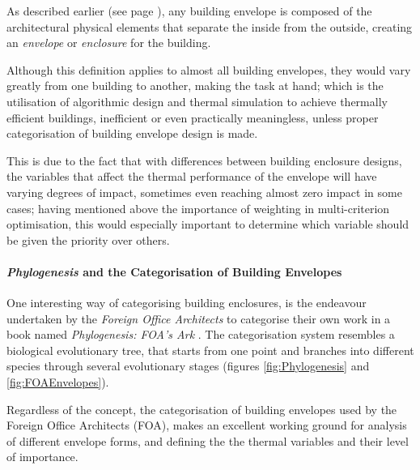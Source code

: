 As described earlier (see page \pageref{BuildEnvDef}), any building envelope is composed of the architectural physical elements that separate the inside from the outside, creating an \emph{envelope} or \emph{enclosure} for the building.

Although this definition applies to almost all building envelopes, they would vary greatly from one building to another, making the task at hand; which is the utilisation of algorithmic design and thermal simulation to achieve thermally efficient buildings, inefficient or even practically meaningless, unless proper categorisation of building envelope design is made.

This is due to the fact that with differences between building enclosure designs, the variables that affect the thermal performance of the envelope will have varying degrees of impact, sometimes even reaching almost zero impact in some cases; having mentioned above the importance of weighting in multi-criterion optimisation, this would especially important to determine which variable should be given the priority over others.

\paragraph{\emph{Phylogenesis} and the Categorisation of Building Envelopes}\mbox{}

One interesting way of categorising building enclosures, is the endeavour undertaken by the \emph{Foreign Office Architects} to categorise their own work in a book named \emph{Phylogenesis: FOA's Ark} \cite{foa04}. The categorisation system resembles a biological evolutionary tree, that starts from one point and branches into different species through several evolutionary stages (figures \ref{fig:Phylogenesis} and \ref{fig:FOAEnvelopes}).

Regardless of the concept, the categorisation of building envelopes used by the Foreign Office Architects (FOA), makes an excellent working ground for analysis of different envelope forms, and defining the the thermal variables and their level of importance.

